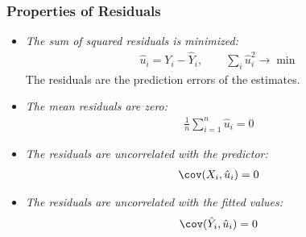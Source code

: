 

\begin{frame}
\frametitle{Properties of Residuals}
\begin{itemize}
\item \emph{The sum of squared residuals is minimized:}
\begin{align*}
\hat{u}_{i} = Y_{i} - \hat{Y}_{i}, \qquad
\sum\nolimits_{i}\hat{u}_{i}^{2} \to \min
\end{align*}
The residuals are the prediction errors of the estimates. 
\item \emph{The mean residuals are zero:}
\begin{align*}
\tfrac{1}{n} \sum_{i=1}^{n} \hat{u}_{i} = 0
\end{align*}
\item \emph{The residuals are uncorrelated with the predictor:}
\begin{align*}
\cov(X_{i}, \hat{u}_{i}) = 0
\end{align*}
\item \emph{The residuals are uncorrelated with the fitted values:}
\begin{align*}
\cov(\hat{Y}_{i}, \hat{u}_{i}) = 0
\end{align*}
\end{itemize}
\end{frame}


